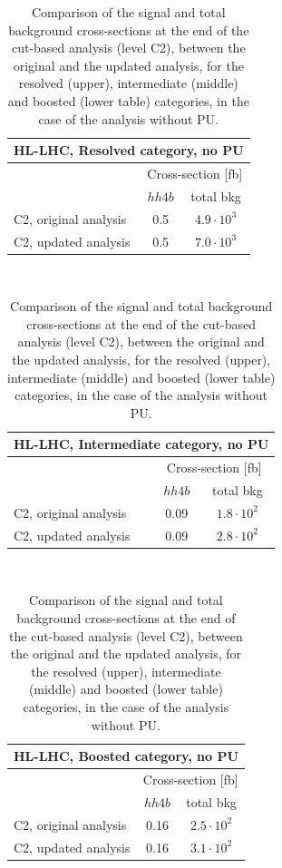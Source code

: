 \documentclass[11pt,a4paper]{article}
\begin{document}
\begin{table}[h!]
  \centering \small
   \begin{tabular}{|l|cc|}
  \hline
\multicolumn{3}{|c|}{HL-LHC, Resolved category, no PU}\\
\hline
&  \multicolumn{2}{c|}{Cross-section [fb]}  \\
   &  $hh4b$ &  total bkg \\
  \hline
  C2, original analysis    & 0.5  &   $4.9\cdot 10^3$        \\
  C2, updated analysis    & 0.5  &   $7.0\cdot 10^3$        \\
\hline
   \end{tabular}\\
   \vspace{0.5cm}
    \begin{tabular}{|l|cc|}
  \hline
\multicolumn{3}{|c|}{HL-LHC, Intermediate category, no PU}\\
\hline
&  \multicolumn{2}{c|}{Cross-section [fb]}  \\
   &  $hh4b$ &  total bkg \\
  \hline
  C2, original analysis    &  0.09  &  $1.8\cdot 10^2$        \\
  C2, updated analysis    &  0.09  &  $2.8\cdot 10^2$      \\
\hline
    \end{tabular}\\
     \vspace{0.5cm}
    \begin{tabular}{|l|cc|}
  \hline
\multicolumn{3}{|c|}{HL-LHC, Boosted category, no PU}\\
\hline
&  \multicolumn{2}{c|}{Cross-section [fb]}  \\
   &  $hh4b$ &  total bkg \\
  \hline
  C2, original analysis    &   0.16  &   $2.5\cdot 10^2$       \\
  C2, updated analysis    &    0.16  &   $3.1\cdot 10^2$       \\
\hline
   \end{tabular}
    \caption{\small Comparison of the signal and total background
      cross-sections at the end of the cut-based analysis (level C2),
      between the original and the updated analysis,  for the resolved (upper),
      intermediate (middle) and boosted
      (lower table) categories, in the case of the analysis
      without PU.
 \label{tab:cutflow_noPU_1}}
\end{table}
\end{document}
